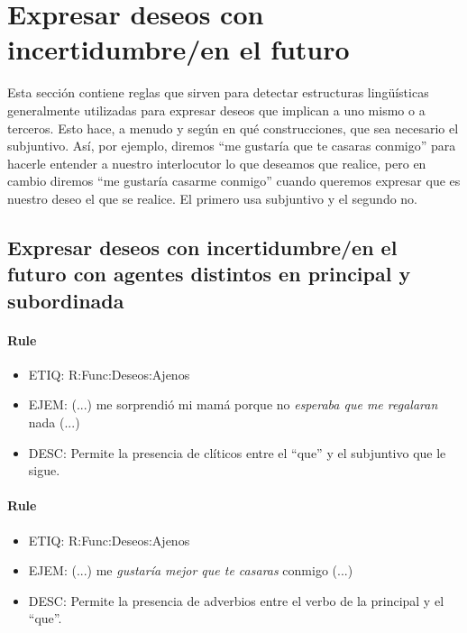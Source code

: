 \documentclass[11pt]{report}
\begin{document}
\section{Expresar deseos con incertidumbre/en el futuro}
Esta sección contiene reglas que sirven para detectar estructuras lingüísticas generalmente utilizadas para expresar deseos que implican a uno mismo o a terceros. Esto hace, a menudo y según en qué construcciones, que sea necesario el subjuntivo. Así, por ejemplo, diremos ``me gustaría que te casaras conmigo'' para hacerle entender a nuestro interlocutor lo que deseamos que realice, pero en cambio diremos ``me gustaría casarme conmigo'' cuando queremos expresar que es nuestro deseo el que se realice. El primero usa subjuntivo y el segundo no.

\subsection{Expresar deseos con incertidumbre/en el futuro con agentes distintos en principal y subordinada}
\paragraph*{Rule}
\begin{itemize}
\item ETIQ: R:Func:Deseos:Ajenos
\item EJEM: (...) me sorprendió mi mamá porque no \emph{esperaba que me regalaran} nada (...)
\item DESC: Permite la presencia de clíticos entre el ``que'' y el subjuntivo que le sigue.
\end{itemize}

\paragraph*{Rule}
\begin{itemize}
\item ETIQ: R:Func:Deseos:Ajenos
\item EJEM: (...) me  \emph{gustaría mejor que te casaras} conmigo (...)
\item DESC: Permite la presencia de adverbios entre el verbo de la principal y el ``que''.
\end{itemize}
\end{document}
